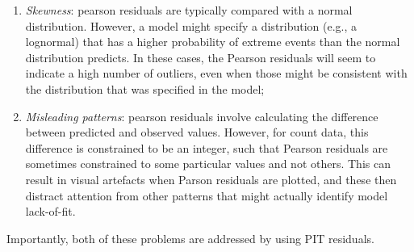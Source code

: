 \begin{enumerate}
    \item \textit{Skewness}:  pearson residuals are typically compared with a normal distribution.  However, a model might specify a distribution (e.g., a lognormal) that has a higher probability of extreme events than the normal distribution predicts. In these cases, the Pearson residuals will seem to indicate a high number of outliers, even when those might be consistent with the distribution that was specified in the model;

    \item \textit{Misleading patterns}:  pearson residuals involve calculating the difference between predicted and observed values.  However, for count data, this difference is constrained to be an integer, such that Pearson residuals are sometimes constrained to some particular values and not others. This can result in visual artefacts when Parson residuals are plotted, and these then distract attention from other patterns that might actually identify model lack-of-fit.  
\end{enumerate}
Importantly, both of these problems are addressed by using PIT residuals.  

\lstset{style=Rcode} 


